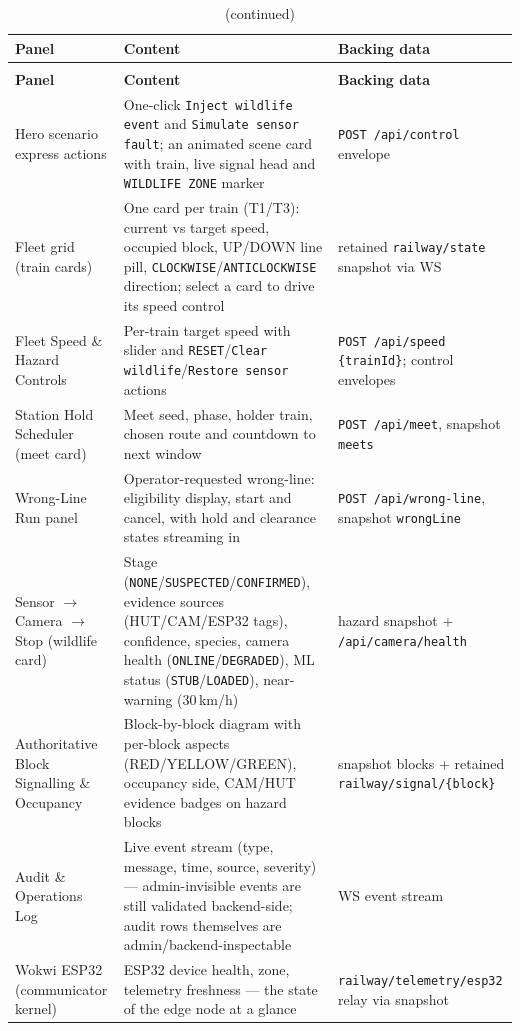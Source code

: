 \begin{longtable}{>{\raggedright}p{4.6cm} >{\raggedright\arraybackslash}p{5.6cm} >{\raggedright\arraybackslash}p{4.7cm}}
\caption{Dashboard panels}\label{tab:dashpanels}\\
\toprule
\textbf{Panel} & \textbf{Content} & \textbf{Backing data} \\
\midrule
\endfirsthead
\caption[]{(continued)}\\
\toprule
\textbf{Panel} & \textbf{Content} & \textbf{Backing data} \\
\midrule
\endhead
Hero scenario express actions & One-click \texttt{Inject wildlife event} and \texttt{Simulate sensor fault}; an animated scene card with train, live signal head and \texttt{WILDLIFE ZONE} marker & \texttt{POST /api/control} envelope \\
Fleet grid (train cards) & One card per train (T1/T3): current vs target speed, occupied block, UP/DOWN line pill, \texttt{CLOCKWISE}/\texttt{ANTICLOCKWISE} direction; select a card to drive its speed control & retained \texttt{railway/state} snapshot via WS \\
Fleet Speed \& Hazard Controls & Per-train target speed with slider and \texttt{RESET}/\texttt{Clear wildlife}/\texttt{Restore sensor} actions & \texttt{POST /api/speed \{trainId\}}; control envelopes \\
Station Hold Scheduler (meet card) & Meet seed, phase, holder train, chosen route and countdown to next window & \texttt{POST /api/meet}, snapshot \texttt{meets} \\
Wrong-Line Run panel & Operator-requested wrong-line: eligibility display, start and cancel, with hold and clearance states streaming in & \texttt{POST /api/wrong-line}, snapshot \texttt{wrongLine} \\
Sensor $\rightarrow$ Camera $\rightarrow$ Stop (wildlife card) & Stage (\texttt{NONE}/\texttt{SUSPECTED}/\texttt{CONFIRMED}), evidence sources (HUT/CAM/ESP32 tags), confidence, species, camera health (\texttt{ONLINE}/\texttt{DEGRADED}), ML status (\texttt{STUB}/\texttt{LOADED}), near-warning (30\,km/h) & hazard snapshot + \texttt{/api/camera/health} \\
Authoritative Block Signalling \& Occupancy & Block-by-block diagram with per-block aspects (RED/YELLOW/GREEN), occupancy side, CAM/HUT evidence badges on hazard blocks & snapshot blocks + retained \texttt{railway/signal/\{block\}} \\
Audit \& Operations Log & Live event stream (type, message, time, source, severity) --- admin-invisible events are still validated backend-side; audit rows themselves are admin/backend-inspectable & WS event stream \\
Wokwi ESP32 (communicator kernel) & ESP32 device health, zone, telemetry freshness --- the state of the edge node at a glance & \texttt{railway/telemetry/esp32} relay via snapshot \\
\bottomrule
\end{longtable}

